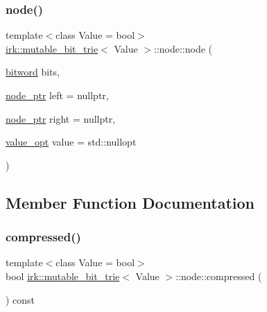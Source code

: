\mbox{\label{structirk_1_1mutable__bit__trie_1_1node_a8b89d07cbc5be62f39eb3995659812b2}} 
\subsubsection{\texorpdfstring{node()}{node()}\hspace{0.1cm}{\footnotesize\ttfamily [2/2]}}
{\footnotesize\ttfamily template$<$class Value = bool$>$ \\
\mbox{\hyperlink{classirk_1_1mutable__bit__trie}{irk\+::mutable\+\_\+bit\+\_\+trie}}$<$ Value $>$\+::node\+::node (\begin{DoxyParamCaption}\item[{\mbox{\hyperlink{namespaceirk_a979e09720c2ef05573819388a3c0e79a}{bitword}}}]{bits,  }\item[{\mbox{\hyperlink{classirk_1_1mutable__bit__trie_abd23179ac4f02a981d4f47b4c0652287}{node\+\_\+ptr}}}]{left = {\ttfamily nullptr},  }\item[{\mbox{\hyperlink{classirk_1_1mutable__bit__trie_abd23179ac4f02a981d4f47b4c0652287}{node\+\_\+ptr}}}]{right = {\ttfamily nullptr},  }\item[{\mbox{\hyperlink{classirk_1_1mutable__bit__trie_a9a5ed79af3e7e28054b00c2284b35612}{value\+\_\+opt}}}]{value = {\ttfamily std\+:\+:nullopt} }\end{DoxyParamCaption})\hspace{0.3cm}{\ttfamily [inline]}}



\subsection{Member Function Documentation}
\mbox{\label{structirk_1_1mutable__bit__trie_1_1node_a3b28e6bf24b4500b5b9fd7d3c1bb48e0}} 
\subsubsection{\texorpdfstring{compressed()}{compressed()}}
{\footnotesize\ttfamily template$<$class Value = bool$>$ \\
bool \mbox{\hyperlink{classirk_1_1mutable__bit__trie}{irk\+::mutable\+\_\+bit\+\_\+trie}}$<$ Value $>$\+::node\+::compressed (\begin{DoxyParamCaption}{ }\end{DoxyParamCaption}) const\hspace{0.3cm}{\ttfamily [inline]}}



